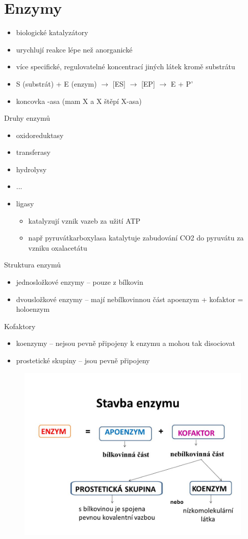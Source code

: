 \documentclass{article}
\begin{document}
\section{Enzymy}
\begin{itemize}
  \item biologické katalyzátory
  \item urychlují reakce lépe než anorganické
  \item více specifické, regulovatelné koncentrací jiných látek kromě substrátu
  \item S (substrát) + E (enzym) $\rightarrow$ [ES] $\rightarrow$ [EP] $\rightarrow$ E + P'
  \item koncovka -asa (mam X a X štěpí X-asa)
\end{itemize}
Druhy enzymů
\begin{itemize}
  \item oxidoreduktasy
  \item transferasy
  \item hydrolysy
  \item ...
  \item ligasy
  \begin{itemize}
    \item katalyzují vznik vazeb za užití ATP
    \item např pyruvátkarboxylasa katalytuje zabudování CO2 do pyruvátu za vzniku oxalacetátu
  \end{itemize}
\end{itemize}
Struktura enzymů
\begin{itemize}
  \item jednosložkové enzymy -- pouze z bílkovin
  \item dvousložkové enzymy -- mají nebílkovinnou část apoenzym + kofaktor = holoenzym
\end{itemize}
Kofaktory
\begin{itemize}
  \item koenzymy -- nejsou pevně připojeny k enzymu a mohou tak disociovat
  \item prostetické skupiny -- jsou pevně připojeny
\end{itemize}
\begin{figure}[h]
    \includegraphics[width=0.5\linewidth]{stavba_enzymu.jpg}
\end{figure}
\end{document}
